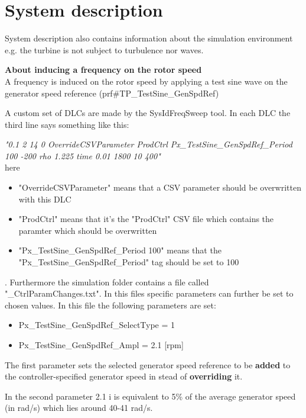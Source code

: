 \section{System description} \label{sec:sys-descr}



System description also contains information about the simulation environment e.g. the turbine is not subject to turbulence nor waves.


\noindent \textbf{About inducing a frequency on the rotor speed}\\
A frequency is induced on the rotor speed by applying a test sine wave on the generator speed reference  (prf\#TP\_TestSine\_GenSpdRef)

A custom set of DLCs are made by the SysIdFreqSweep tool. In each DLC the third line says something like this:

\textit{"0.1 2 14 0 OverrideCSVParameter ProdCtrl Px\_TestSine\_GenSpdRef\_Period 100 -200 rho 1.225 time 0.01 1800 10 400"} \\
here 
\begin{itemize}
	\item "OverrideCSVParameter" means that a CSV parameter should be overwritten with this DLC
	\item "ProdCtrl" means that it's the "ProdCtrl" CSV file which contains the paramter which should be overwritten
	\item "Px\_TestSine\_GenSpdRef\_Period 100" means that the "Px\_TestSine\_GenSpdRef\_Period" tag should be set to 100
\end{itemize}. 
Furthermore the simulation folder contains a file called "\_CtrlParamChanges.txt". In this files specific parameters can further be set to chosen values. In this file the following parameters are set:
\begin{itemize}
	\item Px\_TestSine\_GenSpdRef\_SelectType 	= 1
	\item Px\_TestSine\_GenSpdRef\_Ampl			= 2.1 [rpm]
\end{itemize}
The first parameter sets the selected generator speed reference to be \textbf{added} to the controller-specified generator speed in stead of \textbf{overriding} it.

In the second parameter 2.1 i is equivalent to 5\% of the average generator speed (in rad/s) which lies around 40-41 rad/s.